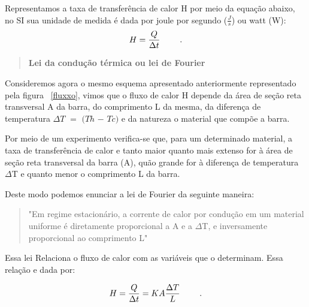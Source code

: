 \documentclass[a4wide]{report}
\begin{document}
Representamos a taxa de transferência de calor H por meio da equação abaixo, no SI sua 
unidade de medida é dada por joule por segundo ($\frac{J}{s}$) ou watt (W):
\begin{equation}
\centering
H   =   \frac{Q}{\Delta t}
~~~~~~~.
\label{equacao_fluxo}
\end{equation}

\begin{quote}

\centering

\bf Lei da condução térmica ou lei de Fourier

\end{quote}

Consideremos agora o mesmo esquema apresentado anteriormente representado pela figura ~\ref{fluxxo}, 
vimos que o fluxo de calor H depende da área de seção reta transversal A da barra, do 
comprimento L da mesma, da diferença de temperatura $\Delta T$ $=$ $(Th$ $-$ $Tc)$ e da natureza o material que
compõe a barra.

Por meio de um experimento verifica-se que, para um determinado material, a taxa de transferência 
de calor e tanto maior quanto mais extenso for à área de seção reta transversal da barra (A), 
quão grande for à diferença de temperatura $\Delta$T e quanto menor o comprimento L da barra.

Deste modo podemos enunciar a lei de Fourier da seguinte maneira:
\begin{quote}

\centering

"Em regime estacionário, a corrente de calor por condução em um material uniforme é diretamente 
proporcional a A e a $\Delta$T, e inversamente proporcional ao comprimento L"

\end{quote}

Essa lei Relaciona o fluxo de calor com as variáveis que o determinam. Essa relação e dada por:

\begin{equation}
\centering
H   =   \frac{Q}{\Delta t} = KA \frac{\Delta T}{L}
~~~~~~~.
\label{equacao_fourier}
\end{equation}
\end{document}

